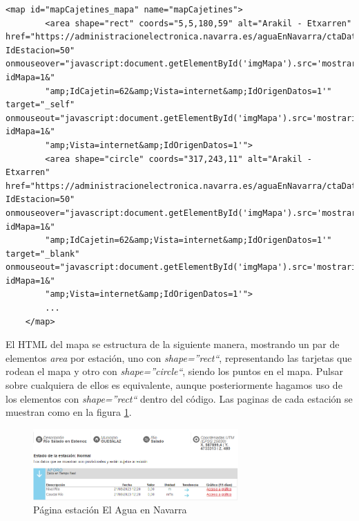 \begin{lstlisting}[basicstyle=\footnotesize, caption={HTML mapa estaciones en El Agua en Navarra}]
	<map id="mapCajetines_mapa" name="mapCajetines">
		<area shape="rect" coords="5,5,180,59" alt="Arakil - Etxarren" href="https://administracionelectronica.navarra.es/aguaEnNavarra/ctaDatosEstacion.aspx?IdEstacion=50" onmouseover="javascript:document.getElementById('imgMapa').src='mostrarimagen.aspx?idMapa=1&"
		"amp;IdCajetin=62&amp;Vista=internet&amp;IdOrigenDatos=1'" target="_self" onmouseout="javascript:document.getElementById('imgMapa').src='mostrarimagen.aspx?idMapa=1&"
		"amp;Vista=internet&amp;IdOrigenDatos=1'">
		<area shape="circle" coords="317,243,11" alt="Arakil - Etxarren" href="https://administracionelectronica.navarra.es/aguaEnNavarra/ctaDatosEstacion.aspx?IdEstacion=50" onmouseover="javascript:document.getElementById('imgMapa').src='mostrarimagen.aspx?idMapa=1&"
		"amp;IdCajetin=62&amp;Vista=internet&amp;IdOrigenDatos=1'" target="_blank" onmouseout="javascript:document.getElementById('imgMapa').src='mostrarimagen.aspx?idMapa=1&"
		"amp;Vista=internet&amp;IdOrigenDatos=1'">
		...
	</map>
\end{lstlisting}

El HTML del mapa se estructura de la siguiente manera, mostrando un par de elementos \textit{area} por estación, uno con \textit{shape=''rect``}, representando las tarjetas que rodean el mapa y otro con \textit{shape=''circle``}, siendo los puntos en el mapa. Pulsar sobre cualquiera de ellos es equivalente, aunque posteriormente hagamos uso de los elementos con \textit{shape=''rect``} dentro del código.\newline
\newline
Las paginas de cada estación se muestran como en la figura \ref{fig:ej23}.

\begin{figure} [H]
	\centering
	\includegraphics[width=0.7\textwidth]{fig/AguaEnNavarraEstacion.png}
	\caption[Página estación de El Agua en Navarra]{Página estación El Agua en Navarra}
	\label{fig:ej23}
\end{figure}

